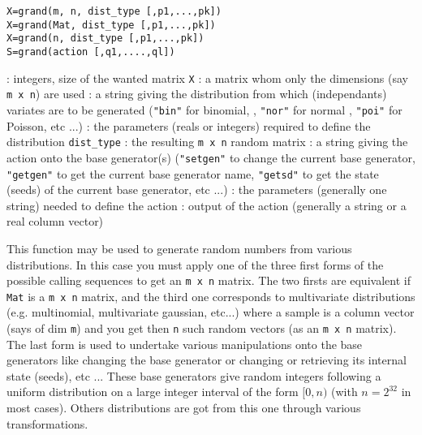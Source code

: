 \begin{mandesc}
\end{mandesc}
\begin{calling_sequence}
\begin{verbatim}
X=grand(m, n, dist_type [,p1,...,pk])  
X=grand(Mat, dist_type [,p1,...,pk])  
X=grand(n, dist_type [,p1,...,pk])  
S=grand(action [,q1,....,ql])  
\end{verbatim}
\end{calling_sequence}
\begin{parameters}
  \begin{varlist}
    : integers, size of the wanted matrix \verb!X!
   : a matrix whom only the dimensions (say \verb!m x n!) are used
   : a string giving the distribution from which (independants) variates are to be 
     generated (\verb!"bin"! for binomial, , \verb!"nor"! for normal , \verb!"poi"! for Poisson, etc ...)
   : the parameters (reals or integers) required to define the distribution 
    \verb!dist_type!
   : the resulting \verb!m x n! random matrix
   : a string giving the action onto the base generator(s) (\verb!"setgen"! to change the current base 
     generator,  \verb!"getgen"! to get the current base generator name, \verb!"getsd"! to get the 
     state (seeds) of the current base generator, etc ...)
   : the parameters (generally one string) needed to define the action
   : output of the action (generally a string or a real column vector)
  \end{varlist}
  \end{parameters}
  
\begin{mandescription}
  This function may be used to generate random numbers from various distributions. In this 
  case you must apply one of the three first forms of the possible
  calling sequences to get an \verb!m x n! matrix. 
  The two firsts are equivalent if \verb!Mat! is a \verb!m x n! matrix, 
  and the third one corresponds to multivariate distributions (e.g. multinomial, multivariate
  gaussian, etc...) where a sample is a column vector (says of dim \verb!m!)
  and you get then \verb!n! such random vectors (as an \verb!m x n! matrix). 
  The last form is used to undertake various manipulations onto the base generators
  like changing the base generator or changing or retrieving its internal state (seeds), 
  etc ... These base generators give random integers following a
  uniform distribution on a large integer interval of the form $[0,n)$
  (with $n=2^{32}$ in most cases). Others distributions are got from
  this one through various transformations.
\end{mandescription}

